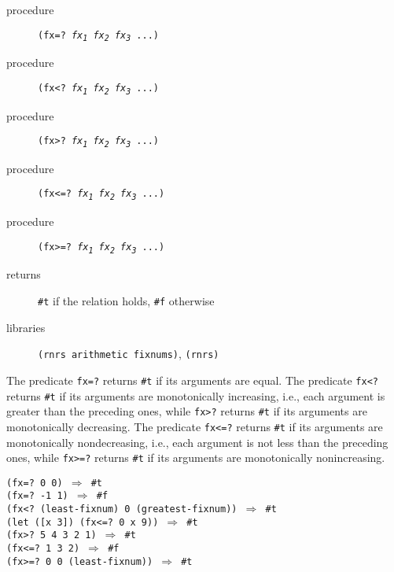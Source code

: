 \begin{description}

\label{objects_s153}\item[procedure] \texttt{(fx=? \textit{fx\textsubscript{1}} \textit{fx\textsubscript{2}} \textit{fx\textsubscript{3}} ...)}



\item[procedure] \texttt{(fx\textless{}? \textit{fx\textsubscript{1}} \textit{fx\textsubscript{2}} \textit{fx\textsubscript{3}} ...)}



\item[procedure] \texttt{(fx\textgreater{}? \textit{fx\textsubscript{1}} \textit{fx\textsubscript{2}} \textit{fx\textsubscript{3}} ...)}



\item[procedure] \texttt{(fx\textless{}=? \textit{fx\textsubscript{1}} \textit{fx\textsubscript{2}} \textit{fx\textsubscript{3}} ...)}



\item[procedure] \texttt{(fx\textgreater{}=? \textit{fx\textsubscript{1}} \textit{fx\textsubscript{2}} \textit{fx\textsubscript{3}} ...)}



\item[returns] \texttt{\#{}t} if the relation holds, \texttt{\#{}f} otherwise


\item[libraries] \texttt{(rnrs arithmetic fixnums)}, \texttt{(rnrs)}
\end{description}


The predicate \texttt{fx=?} returns \texttt{\#{}t} if its arguments are equal.
The predicate \texttt{fx\textless{}?} returns \texttt{\#{}t} if its arguments are monotonically
increasing, i.e., each argument is greater than the preceding ones,
while \texttt{fx\textgreater{}?} returns \texttt{\#{}t} if its arguments are monotonically decreasing.
The predicate \texttt{fx\textless{}=?} returns \texttt{\#{}t} if its arguments are monotonically
nondecreasing, i.e., each argument is not less than the preceding ones,
while \texttt{fx\textgreater{}=?} returns \texttt{\#{}t} if its arguments are monotonically nonincreasing.


\begin{alltt}
(fx=? 0 0) \(\Rightarrow\) \#{}t
(fx=? -1 1) \(\Rightarrow\) \#{}f
(fx\textless{}? (least-fixnum) 0 (greatest-fixnum)) \(\Rightarrow\) \#{}t
(let ([x 3]) (fx\textless{}=? 0 x 9)) \(\Rightarrow\) \#{}t
(fx\textgreater{}? 5 4 3 2 1) \(\Rightarrow\) \#{}t
(fx\textless{}=? 1 3 2) \(\Rightarrow\) \#{}f
(fx\textgreater{}=? 0 0 (least-fixnum)) \(\Rightarrow\) \#{}t
\end{alltt}

